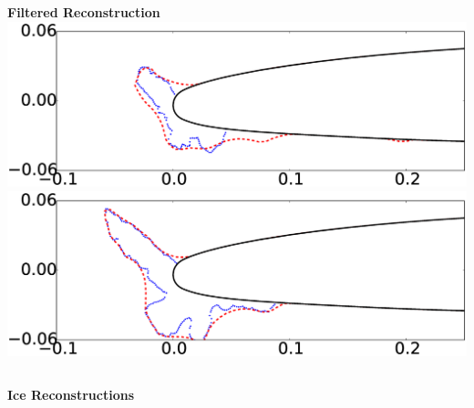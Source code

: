 \documentclass[9pt]{beamer}
\begin{document}
\begin{frame}
\begin{columns}[c]
    {\bf Filtered Reconstruction} \\
    \includegraphics[width=1\textwidth]{ReconstructionE3} \\
    \includegraphics[width=1\textwidth]{ReconstructionE4} \\
\end{columns}
\begin{center}
{\bf Ice Reconstructions}
\end{center}
\end{frame}
\end{document}
